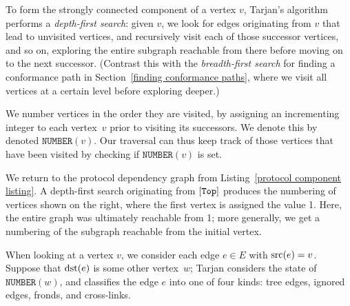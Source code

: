 \documentclass[../generics]{subfiles}
\begin{document}
\newcommand{\Number}[1]{\texttt{NUMBER}(#1)}
\newcommand{\Lowlink}[1]{\texttt{LOWLINK}(#1)}
\newcommand{\OnStack}[1]{\texttt{ONSTACK}(#1)}

To form the strongly connected component of a vertex $v$, Tarjan's algorithm performs a \emph{depth-first search}: given $v$, we look for edges originating from $v$ that lead to unvisited vertices, and recursively visit each of those successor vertices, and so on, exploring the entire subgraph reachable from there before moving on to the next successor. (Contrast this with the \emph{breadth-first search} for finding a conformance path in Section~\ref{finding conformance paths}, where we visit all vertices at a certain level before exploring deeper.)

\begin{wrapfigure}[11]{r}{2.9cm}
\end{wrapfigure}

We number vertices in the order they are visited, by assigning an incrementing integer to each vertex~$v$ prior to visiting its successors. We denote this by denoted $\Number{v}$. Our traversal can thus keep track of those vertices that have been visited by checking if $\Number{v}$ is set.

We return to the protocol dependency graph from Listing~\ref{protocol component listing}. A depth-first search originating from $[\texttt{Top}]$ produces the numbering of vertices shown on the right, where the first vertex is assigned the value 1. Here, the entire graph was ultimately reachable from 1; more generally, we get a numbering of the subgraph reachable from the initial vertex.

When looking at a vertex $v$, we consider each edge $e\in E$ with $\operatorname{src}(e)=v$. Suppose that $\operatorname{dst}(e)$ is some other vertex~$w$; Tarjan considers the state of $\Number{w}$, and classifies the edge $e$ into one of four kinds: tree edges, ignored edges, fronds, and cross-links.
\end{document}
